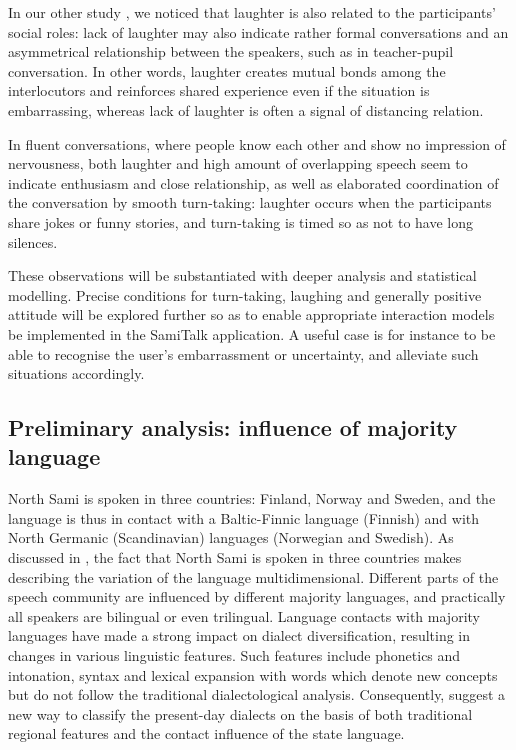 \documentclass[runningheads,a4paper]{llncs}
\begin{document}
In our other study \cite{Hiovain:Jokinen:LREC:16}, we noticed that laughter is also related to the participants' social roles: lack of laughter may also indicate rather formal conversations and an asymmetrical relationship between the speakers, such as in teacher-pupil conversation. In other words, laughter creates mutual bonds among the interlocutors and reinforces shared experience even if the situation is embarrassing, whereas lack of laughter is often a signal of distancing relation.

In fluent conversations, where people know each other and show no impression of nervousness, both laughter and high amount of overlapping speech seem to indicate enthusiasm and close relationship, as well as elaborated coordination of the conversation by smooth turn-taking: laughter occurs when the participants share jokes or funny stories, and turn-taking is timed so as not to have long silences.

These observations will be substantiated with deeper analysis and statistical modelling. Precise conditions for turn-taking, laughing and generally positive attitude will be explored further so as to enable appropriate interaction models be implemented in the SamiTalk application. A useful case is for instance to be able to recognise the user's embarrassment or uncertainty, and alleviate such situations accordingly.


\subsection{Preliminary analysis: influence of majority language}
\label{sec:majority-language}

North Sami is spoken in three countries: Finland, Norway and Sweden, and the language is thus in contact with a Baltic-Finnic language (Finnish) and with North Germanic (Scandinavian) languages (Norwegian and Swedish).
As discussed in \cite{Aikio:ea:14}, the fact that North Sami is spoken in three countries makes describing the variation of the language multidimensional. Different parts of the speech community are influenced by different majority languages, and practically all speakers are bilingual or even trilingual. Language contacts with majority languages have made a strong impact on dialect diversification, resulting in changes in various linguistic features. Such features include phonetics and intonation, syntax and lexical expansion with words which denote new concepts but do not follow the traditional dialectological analysis. Consequently, \cite{Aikio:ea:14} suggest a new way to classify the present-day dialects on the basis of both traditional regional features and the contact influence of the state language.
\end{document}
